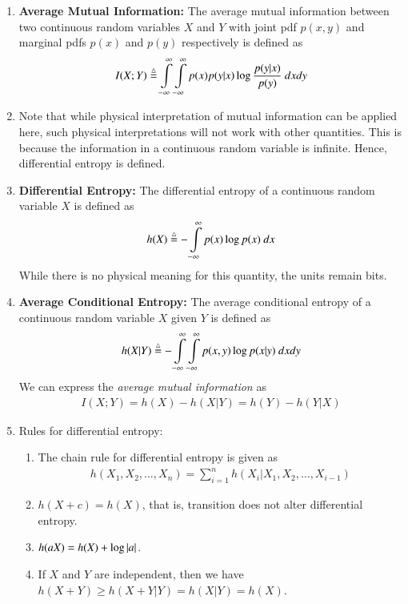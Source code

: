\documentclass[journal,12pt,twocolumn]{IEEEtran}
\renewcommand\thesection{\arabic{section}}
\begin{document}
\begin{enumerate}[label=\thesection.\arabic*, ref=\thesection.\theenumi]
    \item \textbf{Average Mutual Information:} The average mutual information
    between two continuous random variables $X$ and $Y$ with joint pdf $p(x,y)$
    and marginal pdfs $p(x)$ and $p(y)$ respectively is defined as
    \begin{align}
        I(X;Y) \define \int\limits_{-\infty}^{\infty}\int\limits_{-\infty}^{\infty}p(x)p(y|x)\log\frac{p(y|x)}{p(y)}\ dxdy
        \label{eq:mutual-info-cont}
    \end{align}
    \item Note that while physical interpretation of mutual information can be
    applied here, such physical interpretations will not work with other 
    quantities. This is because the information in a continuous random variable
    is infinite. Hence, differential entropy is defined.
    \item \textbf{Differential Entropy:} The differential entropy of a continuous
    random variable $X$ is defined as
    \begin{align}
        h(X) \stackrel{\triangle}{=} -\int\limits_{-\infty}^{\infty}p(x)\log p(x)\ dx
        \label{eq:diff-entropy}
    \end{align}
    While there is no physical meaning for this quantity, the units remain bits.
    \item \textbf{Average Conditional Entropy:} The average conditional entropy 
    of a continuous random variable $X$ given $Y$ is defined as 
    \begin{align}
        h(X|Y) \stackrel{\triangle}{=} -\int\limits_{-\infty}^{\infty}\int\limits_{-\infty}^{\infty}p(x,y)\log p(x|y)\ dxdy
        \label{eq:avg-cond-entropy-cont}
    \end{align}
    We can express the \textit{average mutual information} as 
    \begin{align}
        I(X;Y) = h(X) - h(X|Y) = h(Y) - h(Y|X)
        \label{eq:mutual-self-cond-cont-eqn}
    \end{align}
    \item Rules for differential entropy:
    \begin{enumerate}[label=\theenumi.\arabic*, ref=\theenumi.\arabic*]
        \item The chain rule for differential entropy is given as 
        \begin{align}
            h(X_1,X_2,\ldots,X_n) = \sum_{i=1}^nh(X_i|X_1,X_2,\ldots,X_{i-1})
            \label{eq:chain-rule-cont}
        \end{align}
        \item $h(X + c) = h(X)$, that is, transition does not alter differential
        entropy.
        \item $h(aX) = h(X) + \log\left\vert a\right\vert$.
        \item If $X$ and $Y$ are independent, then we have $h(X+Y) \ge h(X+Y|Y) 
        = h(X|Y) = h(X)$.
    \end{enumerate}
\end{enumerate}
\end{document}

